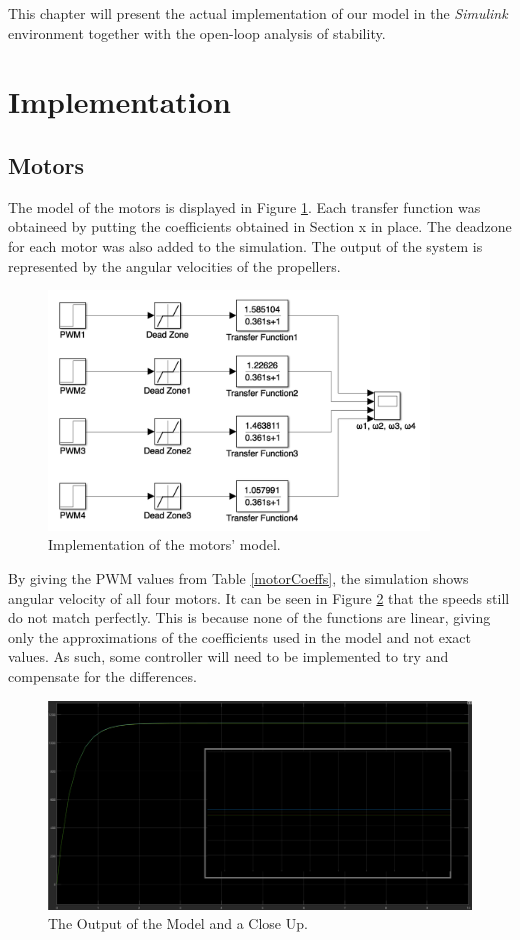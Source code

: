 This chapter will present the actual implementation of our model in the \textit{Simulink} environment together with the open-loop analysis of stability.

\section{Implementation}
\subsection{Motors}
The model of the motors is displayed in Figure \ref{motorr}. Each transfer function was obtaineed by putting the coefficients obtained in Section x in place. The deadzone for each motor was also added to the simulation. The output of the system is represented by the angular velocities of the propellers. 

\begin{figure}[H]
  \centering
    \includegraphics[width=0.9\textwidth]{images/simulinkmotor.png}
	\caption{Implementation of the motors' model.}
	\label{motorr}
\end{figure}

By giving the PWM values from Table \ref{motorCoeffs}, the simulation shows angular velocity of all four motors. It can be seen in Figure \ref{motorScope} that the speeds still do not match perfectly. This is because none of the functions are linear, giving only the approximations of the coefficients used in the model and not exact values. As such, some controller will need to be implemented to try and compensate for the differences.

\begin{figure}[H]
  \centering
    \includegraphics[width=1\textwidth]{images/scopewithcloseup.png}
	\caption{The Output of the Model and a Close Up.}
	\label{motorScope}
\end{figure}

